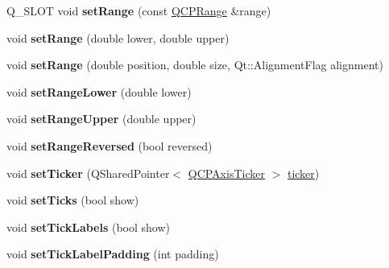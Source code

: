\begin{DoxyCompactItemize}
\mbox{\label{class_q_c_p_axis_a1b0b4637dd2cc1506b87e49dae0152d3}} 
Q\+\_\+\+S\+L\+OT void {\bfseries set\+Range} (const \hyperlink{class_q_c_p_range}{Q\+C\+P\+Range} \&range)
\item 
\mbox{\label{class_q_c_p_axis_a57d6ee9e9009fe88cb19db476ec70bca}} 
void {\bfseries set\+Range} (double lower, double upper)
\item 
\mbox{\label{class_q_c_p_axis_acf60e5b2d631fbc8c4548c3d579cb6d0}} 
void {\bfseries set\+Range} (double position, double size, Qt\+::\+Alignment\+Flag alignment)
\item 
\mbox{\label{class_q_c_p_axis_afcf51227d337db28d1a9ce9a4d1bc91a}} 
void {\bfseries set\+Range\+Lower} (double lower)
\item 
\mbox{\label{class_q_c_p_axis_acd3ca1247aa867b540cd5ec30ccd3bef}} 
void {\bfseries set\+Range\+Upper} (double upper)
\item 
\mbox{\label{class_q_c_p_axis_a2172fdb196b1a0dc3f40992fcad8e9e1}} 
void {\bfseries set\+Range\+Reversed} (bool reversed)
\item 
\mbox{\label{class_q_c_p_axis_a4ee03fcd2c74d05cd1a419b9af5cfbdc}} 
void {\bfseries set\+Ticker} (Q\+Shared\+Pointer$<$ \hyperlink{class_q_c_p_axis_ticker}{Q\+C\+P\+Axis\+Ticker} $>$ \hyperlink{class_q_c_p_axis_a7b7a27151be8235059e1294f73ecf615}{ticker})
\item 
\mbox{\label{class_q_c_p_axis_ac891409315bc379e3b1abdb162c1a011}} 
void {\bfseries set\+Ticks} (bool show)
\item 
\mbox{\label{class_q_c_p_axis_a04ba16e1f6f78d70f938519576ed32c8}} 
void {\bfseries set\+Tick\+Labels} (bool show)
\item 
\mbox{\label{class_q_c_p_axis_af302c479af9dbc2e9f0e44e07c0012ee}} 
void {\bfseries set\+Tick\+Label\+Padding} (int padding)
\item 
\mbox{\label{class_q_c_p_axis_a2b8690c4e8dbc39d9185d2b398ce7a6c}} 

\end{DoxyCompactItemize}
